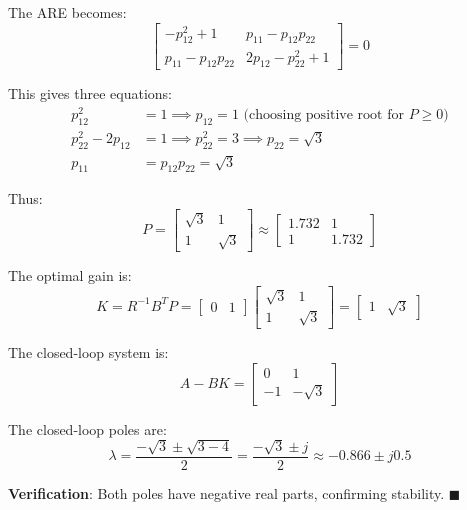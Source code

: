 \begin{examplebox}
The ARE becomes:
\begin{equation}
\begin{bmatrix} -p_{12}^2 + 1 & p_{11} - p_{12}p_{22} \\ p_{11} - p_{12}p_{22} & 2p_{12} - p_{22}^2 + 1 \end{bmatrix} = 0
\end{equation}

This gives three equations:
\begin{align}
p_{12}^2 &= 1 \implies p_{12} = 1 \text{ (choosing positive root for } P \geq 0\text{)} \\
p_{22}^2 - 2p_{12} &= 1 \implies p_{22}^2 = 3 \implies p_{22} = \sqrt{3} \\
p_{11} &= p_{12}p_{22} = \sqrt{3}
\end{align}

Thus:
\begin{equation}
P = \begin{bmatrix} \sqrt{3} & 1 \\ 1 & \sqrt{3} \end{bmatrix} \approx \begin{bmatrix} 1.732 & 1 \\ 1 & 1.732 \end{bmatrix}
\end{equation}

The optimal gain is:
\begin{equation}
K = R^{-1}B^T P = \begin{bmatrix} 0 & 1 \end{bmatrix} \begin{bmatrix} \sqrt{3} & 1 \\ 1 & \sqrt{3} \end{bmatrix} = \begin{bmatrix} 1 & \sqrt{3} \end{bmatrix}
\end{equation}

The closed-loop system is:
\begin{equation}
A - BK = \begin{bmatrix} 0 & 1 \\ -1 & -\sqrt{3} \end{bmatrix}
\end{equation}

The closed-loop poles are:
\begin{equation}
\lambda = \frac{-\sqrt{3} \pm \sqrt{3 - 4}}{2} = \frac{-\sqrt{3} \pm j}{2} \approx -0.866 \pm j0.5
\end{equation}

\textbf{Verification}: Both poles have negative real parts, confirming stability. $\blacksquare$
\end{examplebox}

